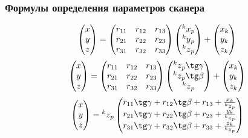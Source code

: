 \documentclass[a4paper, 12pt]{article}
\begin{document}
    \subsubsection{Формулы определения параметров сканера}
    \[
        \begin{pmatrix}
            x\\y\\z
        \end{pmatrix}
        =
        \begin{pmatrix}
            r_{11} & r_{12} & r_{13}\\
            r_{21} & r_{22} & r_{23}\\
            r_{31} & r_{32} & r_{33}
        \end{pmatrix}
        \begin{pmatrix}
            \prescript{k}{}{x}_p\\
            \prescript{k}{}{y}_p\\
            \prescript{k}{}{z}_p
        \end{pmatrix}
        +
        \begin{pmatrix}
            x_k\\y_k\\z_k
        \end{pmatrix}
    \]
    \[
        \begin{pmatrix}
            x\\y\\z
        \end{pmatrix}
        =
        \begin{pmatrix}
            r_{11} & r_{12} & r_{13}\\
            r_{21} & r_{22} & r_{23}\\
            r_{31} & r_{32} & r_{33}
        \end{pmatrix}
        \begin{pmatrix}
            \prescript{k}{}{z}_p\tg\gamma\\
            \prescript{k}{}{z}_p\tg\beta\\
            \prescript{k}{}{z}_p
        \end{pmatrix}
        +
        \begin{pmatrix}
            x_k\\y_k\\z_k
        \end{pmatrix}
    \]
    \[
        \begin{pmatrix}
            x\\y\\z
        \end{pmatrix}
        =
        \prescript{k}{}{z}_p
        \begin{pmatrix}
            r_{11}\tg\gamma + r_{12}\tg\beta + r_{13} + \frac{x_k}{\prescript{k}{}{z}_p}\\
            r_{21}\tg\gamma + r_{22}\tg\beta + r_{23} + \frac{y_k}{\prescript{k}{}{z}_p}\\
            r_{31}\tg\gamma + r_{32}\tg\beta + r_{33} + \frac{z_k}{\prescript{k}{}{z}_p}
        \end{pmatrix}
    \]
\end{document}
